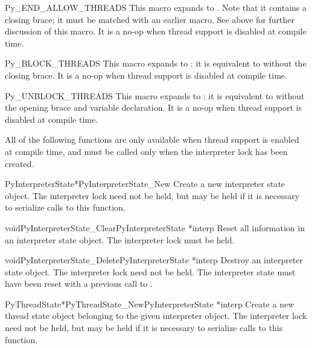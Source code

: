 \documentclass{manual}
\begin{document}
\begin{csimplemacrodesc}{Py_END_ALLOW_THREADS}
This macro expands to
.
Note that it contains a closing brace; it must be matched with an
earlier  macro.  See above for further
discussion of this macro.  It is a no-op when thread support is
disabled at compile time.
\end{csimplemacrodesc}

\begin{csimplemacrodesc}{Py_BLOCK_THREADS}
This macro expands to : it
is equivalent to  without the closing
brace.  It is a no-op when thread support is disabled at compile
time.
\end{csimplemacrodesc}

\begin{csimplemacrodesc}{Py_UNBLOCK_THREADS}
This macro expands to : it is
equivalent to  without the opening brace
and variable declaration.  It is a no-op when thread support is
disabled at compile time.
\end{csimplemacrodesc}

All of the following functions are only available when thread support
is enabled at compile time, and must be called only when the
interpreter lock has been created.

\begin{cfuncdesc}{PyInterpreterState*}{PyInterpreterState_New}{}
Create a new interpreter state object.  The interpreter lock need not
be held, but may be held if it is necessary to serialize calls to this
function.
\end{cfuncdesc}

\begin{cfuncdesc}{void}{PyInterpreterState_Clear}{PyInterpreterState *interp}
Reset all information in an interpreter state object.  The interpreter
lock must be held.
\end{cfuncdesc}

\begin{cfuncdesc}{void}{PyInterpreterState_Delete}{PyInterpreterState *interp}
Destroy an interpreter state object.  The interpreter lock need not be
held.  The interpreter state must have been reset with a previous
call to .
\end{cfuncdesc}

\begin{cfuncdesc}{PyThreadState*}{PyThreadState_New}{PyInterpreterState *interp}
Create a new thread state object belonging to the given interpreter
object.  The interpreter lock need not be held, but may be held if it
is necessary to serialize calls to this function.
\end{cfuncdesc}
\end{document}
